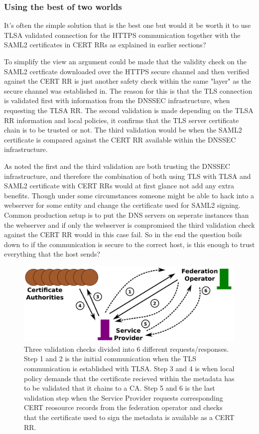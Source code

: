\subsubsection{Using the best of two worlds}
It's often the simple solution that is the best one but would it be worth it to use TLSA validated connection for the HTTPS communication together with the SAML2 certificates in CERT RRs as explained in earlier sections?

To simplify the view an argument could be made that the validity check on the SAML2 certficate downloaded over the HTTPS secure channel and then verified against the CERT RR is just another safety check within the same "layer" as the secure channel was established in.
The reason for this is that the TLS connection is validated first with information from the DNSSEC infrastructure, when requesting the TLSA RR.
The second validation is made depending on the TLSA RR information and local policies, it confirms that the TLS server certificate chain is to be trusted or not.
The third validation would be when the SAML2 certificate is compared against the CERT RR available within the DNSSEC infrastructure.

As noted the first and the third validation are both trusting the DNSSEC infrastructure, and therefore the combination of both using TLS with TLSA and SAML2 certificate with CERT RRs would at first glance not add any extra benefits.
Though under some circumstances someone might be able to hack into a webserver for some entity and change the certificate used for SAML2 signing.
Common production setup is to put the DNS servers on seperate instances than the webserver and if only the webserver is compromised the third validation check against the CERT RR would in this case fail.
So in the end the question boils down to if the communication is secure to the correct host, is this enough to trust everything that the host sends?

\begin{figure}[ht]
\begin{center}
\includegraphics[scale=1]{Figures/bestOfTwoWorlds.png}
\end{center}
\caption{Three validation checks divided into 6 different requests/responses.
Step 1 and 2 is the initial communication when the TLS communication is established with TLSA.
Step 3 and 4 is when local policy demands that the certificate recieved within the metadata has to be validated that it chains to a CA.
Step 5 and 6 is the last validation step when the Service Provider requests corresponding CERT reosource records from the federation operator and checks that the certificate used to sign the metadata is available as a CERT RR.
\label{ch4:bestOfTwoWorlds}}
\end{figure}

